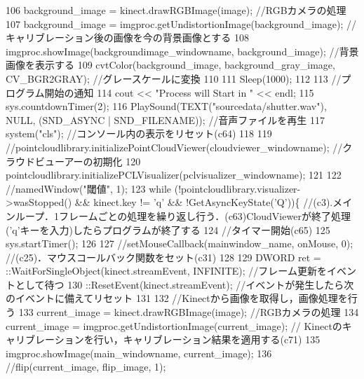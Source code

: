 \begin{DoxyCode}
106         background\_image = kinect.drawRGBImage(image); \textcolor{comment}{//RGBカメラの処理}
107         background\_image = imgproc.getUndistortionImage(background\_image); \textcolor{comment}{//キャリブレーション後の画像を今の背景画像とする}
108         imgproc.showImage(backgroundimage\_windowname, background\_image); \textcolor{comment}{//背景画像を表示する}
109         cvtColor(background\_image, background\_gray\_image, CV\_BGR2GRAY); \textcolor{comment}{//グレースケールに変換}
110         
111         Sleep(1000);
112 
113         \textcolor{comment}{//プログラム開始の通知}
114         cout << \textcolor{stringliteral}{"Process will Start in "} << endl;
115         sys.countdownTimer(2); 
116         PlaySound(TEXT(\textcolor{stringliteral}{"sourcedata/shutter.wav"}), NULL, (SND\_ASYNC | SND\_FILENAME)); \textcolor{comment}{//音声ファイルを再生}
117         system(\textcolor{stringliteral}{"cls"}); \textcolor{comment}{//コンソール内の表示をリセット(c64)}
118 
119         \textcolor{comment}{//pointcloudlibrary.initializePointCloudViewer(cloudviewer\_windowname); //クラウドビューアーの初期化}
120         pointcloudlibrary.initializePCLVisualizer(pclvisualizer\_windowname);
121 
122         \textcolor{comment}{//namedWindow("閾値", 1);}
123         \textcolor{keywordflow}{while} (!pointcloudlibrary.visualizer->wasStopped() && kinect.key != \textcolor{charliteral}{'q'} && !GetAsyncKeyState(\textcolor{charliteral}{'Q'}))\{
       \textcolor{comment}{//(c3).メインループ．1フレームごとの処理を繰り返し行う．(c63)CloudViewerが終了処理('q'キーを入力)したらプログラムが終了する}
124             \textcolor{comment}{//タイマー開始(c65)}
125             sys.startTimer();
126 
127             \textcolor{comment}{//setMouseCallback(mainwindow\_name, onMouse, 0); //(c25)．マウスコールバック関数をセット(c31)}
128 
129             DWORD ret = ::WaitForSingleObject(kinect.streamEvent, INFINITE); \textcolor{comment}{//フレーム更新をイベントとして待つ}
130             ::ResetEvent(kinect.streamEvent); \textcolor{comment}{//イベントが発生したら次のイベントに備えてリセット}
131 
132             \textcolor{comment}{//Kinectから画像を取得し，画像処理を行う}
133             current\_image = kinect.drawRGBImage(image); \textcolor{comment}{//RGBカメラの処理}
134             current\_image = imgproc.getUndistortionImage(current\_image); \textcolor{comment}{//
      Kinectのキャリブレーションを行い，キャリブレーション結果を適用する(c71)}
135             imgproc.showImage(main\_windowname, current\_image);
136             \textcolor{comment}{//flip(current\_image, flip\_image, 1);}

\end{DoxyCode}
